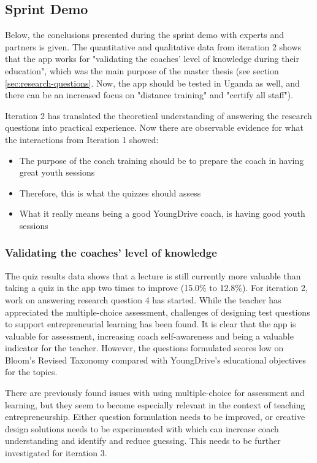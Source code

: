 \subsection{Sprint Demo}

Below, the conclusions presented during the sprint demo with experts and partners is given. The quantitative and qualitative data from iteration 2 shows that the app works for "validating the coaches' level of knowledge during their education", which was the main purpose of the master thesis (see section \ref{sec:research-questions}. Now, the app should be tested in Uganda as well, and there can be an increased focus on "distance training" and "certify all staff").

Iteration 2 has translated the theoretical understanding of answering the research questions into practical experience. Now there are observable evidence for what the interactions from Iteration 1 showed:

\begin{itemize}
\item The purpose of the coach training should be to prepare the coach in having great youth sessions
\item Therefore, this is what the quizzes should assess
\item What it really means being a good YoungDrive coach, is having good youth sessions
\end{itemize}

\subsubsection{Validating the coaches' level of knowledge}
The quiz results data shows that a lecture is still currently more valuable than taking a quiz in the app two times to improve (15.0\% to 12.8\%). For iteration 2, work on answering research question 4 has started. While the teacher has appreciated the multiple-choice assessment, challenges of designing test questions to support entrepreneurial learning has been found. It is clear that the app is valuable for assessment, increasing coach self-awareness and being a valuable indicator for the teacher. However, the questions formulated scores low on Bloom's Revised Taxonomy \citep{krathwohl} compared with YoungDrive's educational objectives for the topics.

There are previously found issues with using multiple-choice for assessment and learning, but they seem to become especially relevant in the context of teaching entrepreneurship. Either question formulation needs to be improved, or creative design solutions needs to be experimented with which can increase coach understanding and identify and reduce guessing. This needs to be further investigated for iteration 3.

